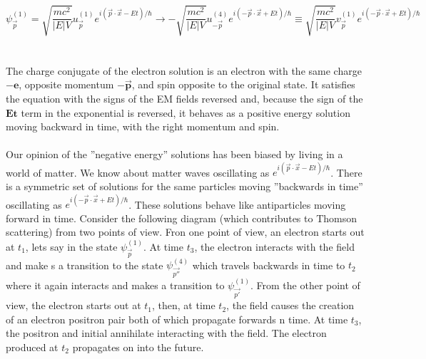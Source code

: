 \documentclass{report}
\begin{document}
\begin{equation}
	\psi^{\left( 1 \right) }_{\vec{p}} = \sqrt{\frac{mc^2}{\left| E \right| V}} u^{\left( 1 \right) }_{\vec{p}} e^{i\left( \vec{p} \cdot \vec{x} - Et \right) / \hbar} \to -\sqrt{\frac{mc^2}{\left| E \right| V}} u^{\left( 4 \right) }_{-\vec{p}} e^{i \left( -\vec{p} \cdot \vec{x} + Et \right) / \hbar} \equiv \sqrt{\frac{mc^2}{\left| E \right| V}} v^{(1)}_{\vec{p}} e^{i\left( -\vec{p} \cdot \vec{x} + Et \right) / \hbar}
\end{equation}
\\
\\
The charge conjugate of the electron solution is an electron with the same charge $\displaystyle \mathbf{-e}$, opposite momentum $\displaystyle \mathbf{-\vec{p}}$, and spin opposite to the original state. It satisfies the equation with the signs of the EM fields reversed and, because the sign of the $\displaystyle \mathbf{Et}$ term in the exponential is reversed, it behaves as a positive energy solution moving backward in time, with the right momentum and spin.
\\
\\
Our opinion of the ''negative energy'' solutions has been biased by living in a world of matter. We know about matter waves oscillating as $\displaystyle e^{i\left( \vec{p} \cdot \vec{x} - Et \right) / \hbar}$. There is a symmetric set of solutions for the same particles moving ''backwards in time'' oscillating as $\displaystyle e^{i\left( -\vec{p} \cdot \vec{x} + Et \right) / \hbar}$. These solutions behave like antiparticles moving forward in time. Consider the following diagram (which contributes to Thomson scattering) from two points of view. Fron one point of view, an electron starts out at $\displaystyle t_1$, lets say in the state $\displaystyle \psi^{\left( 1 \right) }_{\vec{p}}$. At time $t_3$, the electron interacts with the field and make s a transition to the state $\displaystyle \psi^{\left( 4 \right) }_{\vec{p''}}$ which travels backwards in time to $\displaystyle t_2$ where it again interacts and makes a transition to $\displaystyle \psi^{\left( 1 \right) }_{\vec{p'}}$. From the other point of view, the electron starts out at $\displaystyle t_1$, then, at time $\displaystyle t_2$, the field causes the creation of an electron positron pair both of which propagate forwards n time. At time $\displaystyle t_3$, the positron and initial annihilate interacting with the field. The electron produced at $t_2$ propagates on into the future.
\\
\\
\end{document}
